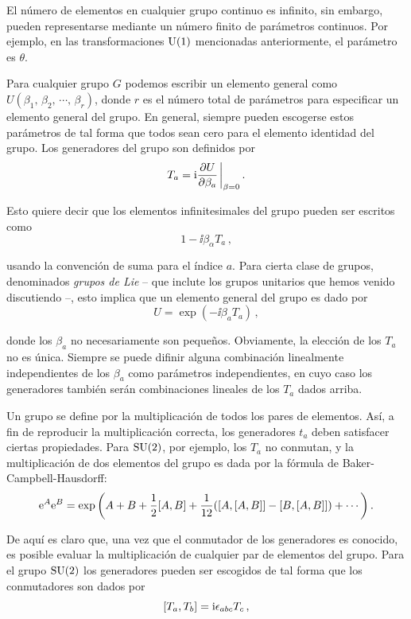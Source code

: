 El número de elementos en cualquier grupo continuo es infinito, sin embargo, pueden representarse mediante un número finito de parámetros continuos. Por ejemplo, en las transformaciones $\mathrm{U}(1)$ mencionadas anteriormente, el parámetro es $\theta$.

Para cualquier grupo $G$ podemos escribir un elemento general como $U(\beta_1,\, \beta_2,\, \cdots,\, \beta_r)$, donde $r$ es el número total de parámetros para especificar un elemento general del grupo. En general, siempre pueden escogerse estos parámetros de tal forma que todos sean cero para el elemento identidad del grupo. Los generadores del grupo son definidos por
%
\begin{equation}
	T_a = \ii \pdv{U}{\beta_a} \eval_{\beta=0} \,.
\end{equation}

Esto quiere decir que los elementos infinitesimales del grupo pueden ser escritos como
%
\begin{equation}
	1 - \ii \beta_\alpha T_a \,,
\end{equation}

\noindent usando la convención de suma para el índice $a$. Para cierta clase de grupos, denominados \emph{grupos de Lie} -- que inclute los grupos unitarios que hemos venido discutiendo --, esto implica que un elemento general del grupo es dado por
%
\begin{equation}
	U = \exp{(- \ii\beta_a T_a)} \,,
\end{equation}

\noindent donde los $\beta_a$ no necesariamente son pequeños. Obviamente, la elección de los $T_a$ no es única. Siempre se puede difinir alguna combinación linealmente independientes de los $\beta_a$ como parámetros independientes, en cuyo caso los generadores también serán combinaciones lineales de los $T_a$ dados arriba.

Un grupo se define por la multiplicación de todos los pares de elementos. Así, a fin de reproducir la multiplicación correcta, los generadores $t_a$ deben satisfacer ciertas propiedades. Para $\mathrm{SU}(2)$, por ejemplo, los $T_a$ no conmutan, y la multiplicación de dos elementos del grupo es dada por la fórmula de Baker-Campbell-Hausdorff:
%
\begin{equation}
	\ee^A \ee^B = \exp \qty(A + B + \frac{1}{2} \comm{A}{B} + \frac{1}{12} \qty(\comm{A}{\comm{A}{B}} - \comm{B}{\comm{A}{B}}) + \cdots) \,.
\end{equation}

De aquí es claro que, una vez que el conmutador de los generadores es conocido, es posible evaluar la multiplicación de cualquier par de elementos del grupo. Para el grupo $\mathrm{SU}(2)$ los generadores pueden ser escogidos de tal forma que los conmutadores son dados por
%
\begin{equation}
	\comm{T_a}{T_b} = \ii \epsilon_{abc} T_c \,,
\end{equation}

